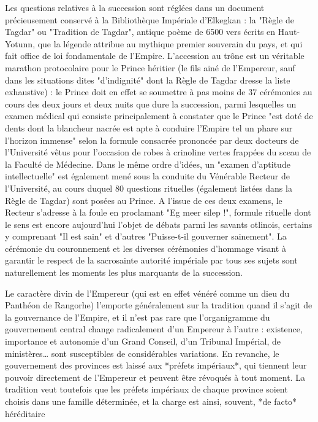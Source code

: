 \documentclass[french, a4paper, 12pt]{article}
\begin{document}
Les questions relatives à la succession sont réglées dans un document précieusement conservé à la Bibliothèque Impériale d'Elkegkan : la "Règle de Tagdar" ou "Tradition de Tagdar", antique poème de 6500 vers écrits en Haut-Yotunn, que la légende attribue au mythique premier souverain du pays, et qui fait office de loi fondamentale de l'Empire. L'accession au trône est un véritable marathon protocolaire pour le Prince héritier (le fils ainé de l'Empereur, sauf dans les situations dites "d'indignité" dont la Règle de Tagdar dresse la liste exhaustive) : le Prince doit en effet se soumettre à pas moins de 37 cérémonies au cours des deux jours et deux nuits que dure la succession, parmi lesquelles un examen médical qui consiste principalement à constater que le Prince "est doté de dents dont la blancheur nacrée est apte à conduire l'Empire tel un phare sur l'horizon immense" selon la formule consacrée prononcée par deux docteurs de l'Université vêtus pour l'occasion de robes à crinoline vertes frappées du sceau de la Faculté de Médecine. Dans le même ordre d'idées, un "examen d'aptitude intellectuelle" est également mené sous la conduite du Vénérable Recteur de l'Université, au cours duquel 80 questions rituelles (également listées dans la Règle de Tagdar) sont posées au Prince. A l'issue de ces deux examens, le Recteur s'adresse à la foule en proclamant "Eg meer silep !", formule rituelle dont le sens est encore aujourd'hui l'objet de débats parmi les savants otlinois, certains y comprenant "Il est sain" et d'autres "Puisse-t-il gouverner sainement". La cérémonie du couronnement et les diverses cérémonies d'hommage visant à garantir le respect de la sacrosainte autorité impériale par tous ses sujets sont naturellement les moments les plus marquants de la succession.

Le caractère divin de l'Empereur (qui est en effet vénéré comme un dieu du Panthéon de Rangorhe) l'emporte généralement sur la tradition quand il s'agit de la gouvernance de l'Empire, et il n'est pas rare que l'organigramme du gouvernement central change radicalement d'un Empereur à l'autre : existence, importance et autonomie d'un Grand Conseil, d'un Tribunal Impérial, de ministères… sont susceptibles de considérables variations. En revanche, le gouvernement des provinces est laissé aux *préfets impériaux*, qui tiennent leur pouvoir directement de l'Empereur et peuvent être révoqués à tout moment. La tradition veut toutefois que les préfets impériaux de chaque province soient choisis dans une famille déterminée, et la charge est ainsi, souvent, *de facto* héréditaire
\end{document}
